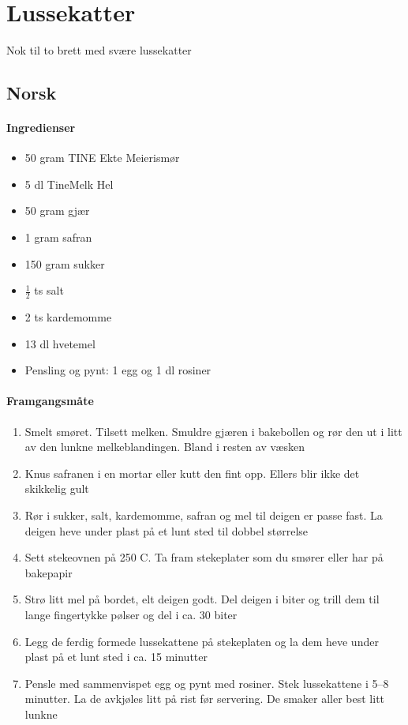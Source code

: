 \section{﻿Lussekatter}
Nok til to brett med svære lussekatter
\subsection{Norsk}

\paragraph{Ingredienser}
\begin{itemize}[noitemsep]
	\item 50 gram TINE Ekte Meierismør
	\item 5 dl TineMelk Hel
	\item 50 gram gjær
	\item 1 gram safran
	\item 150 gram sukker
	\item $\frac{1}{2}$ ts salt
	\item 2 ts kardemomme
	\item 13 dl hvetemel
	\item Pensling og pynt: 1 egg og 1 dl rosiner
\end{itemize}

\paragraph{Framgangsmåte}
\begin{enumerate}[noitemsep]
	\item Smelt smøret. Tilsett melken. Smuldre gjæren i bakebollen og rør den ut i litt av den lunkne melkeblandingen. Bland i resten av væsken
	\item Knus safranen i en mortar eller kutt den fint opp. Ellers blir ikke det skikkelig gult
	\item Rør i sukker, salt, kardemomme, safran og mel til deigen er passe fast. La deigen heve under plast på et lunt sted til dobbel størrelse
	\item Sett stekeovnen på 250 \degree C. Ta fram stekeplater som du smører eller har på bakepapir
	\item Strø litt mel på bordet, elt deigen godt. Del deigen i biter og trill dem til lange fingertykke pølser og del i ca. 30 biter
	\item Legg de ferdig formede lussekattene på stekeplaten og la dem heve under plast på et lunt sted i ca. 15 minutter
	\item Pensle med sammenvispet egg og pynt med rosiner. Stek lussekattene i 5--8 minutter. La de avkjøles litt på rist før servering. De smaker aller best litt lunkne

\end{enumerate}

